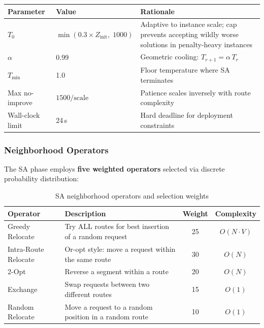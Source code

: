 \documentclass[11pt,a4paper]{article}
\begin{document}
\begin{insightbox}[SA Hyperparameters]
\begin{tabular}{llp{7cm}}
\toprule
\textbf{Parameter} & \textbf{Value} & \textbf{Rationale} \\
\midrule
$T_0$ & $\min(0.3 \times Z_{\text{init}},\; 1000)$ & Adaptive to instance scale; cap prevents accepting wildly worse solutions in penalty-heavy instances \\
$\alpha$ & 0.99 & Geometric cooling: $T_{r+1} = \alpha\, T_r$ \\
$T_{\min}$ & 1.0 & Floor temperature where SA terminates \\
Max no-improve & $1500 / \text{scale}$ & Patience scales inversely with route complexity \\
Wall-clock limit & 24\,s & Hard deadline for deployment constraints \\
\bottomrule
\end{tabular}
\end{insightbox}

\subsubsection{Neighborhood Operators}

The SA phase employs \textbf{five weighted operators} selected via discrete probability distribution:

\begin{table}[H]
\centering
\caption{SA neighborhood operators and selection weights}
\label{tab:operators}
\begin{tabular}{llcc}
\toprule
\textbf{Operator} & \textbf{Description} & \textbf{Weight} & \textbf{Complexity} \\
\midrule
\rowcolor{rowalt}
Greedy Relocate   & Try ALL routes for best insertion of a random request  & 25 & $O(N \cdot V)$ \\
Intra-Route Relocate & Or-opt style: move a request within the same route & 30 & $O(N)$ \\
\rowcolor{rowalt}
2-Opt             & Reverse a segment within a route                       & 20 & $O(N)$ \\
Exchange          & Swap requests between two different routes              & 15 & $O(1)$ \\
\rowcolor{rowalt}
Random Relocate   & Move a request to a random position in a random route   & 10 & $O(1)$ \\
\bottomrule
\end{tabular}
\end{table}
\end{document}
